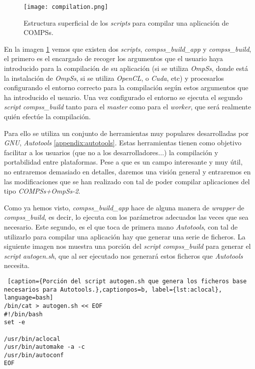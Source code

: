 \bigskip
\begin{figure}[h]
	\centering 
	\caption{Estructura superficial de los \textit{scripts} para compilar una aplicación de COMPSs.}
	\texttt{[image: compilation.png]}
	\label{fig:compilado}
\end{figure}
\par\bigskip

En la imagen \ref{fig:compilado} vemos que existen dos \textit{scripts}, \textit{compss\_build\_app} y \textit{compss\_build}, el primero es el encargado de recoger los argumentos que el usuario haya introducido para la compilación de su aplicación (si se utiliza \textit{OmpSs}, donde está la instalación de \textit{OmpSs}, si se utiliza \textit{OpenCL}, o \textit{Cuda}, etc) y procesarlos configurando el entorno correcto para la compilación según estos argumentos que ha introducido el usuario. Una vez configurado el entorno se ejecuta el segundo \textit{script} \textit{compss\_build} tanto para el \textit{master} como para el \textit{worker}, que será realmente quién efectúe la compilación. 
\par\bigskip
Para ello se utiliza un conjunto de herramientas muy populares desarrolladas por \textit{GNU},  \textit{Autotools} \ref{appendix:autotools}. Estas herramientas tienen como objetivo facilitar a los usuarios (que no a los desarrolladores...) la compilación y portabilidad entre plataformas. Pese a que es un campo interesante y muy útil, no entraremos demasiado en detalles, daremos una visión general y entraremos en las modificaciones que se han realizado con tal de poder compilar aplicaciones del tipo \textit{COMPSs+OmpSs-2}. 
\par\bigskip
Como ya hemos visto, \textit{compss\_build\_app} hace de alguna manera de \textit{wrapper} de \textit{compss\_build}, es decir, lo ejecuta con los parámetros adecuados las veces que sea necesario. Este segundo, es el que toca de primera mano \textit{Autotools}, con tal de utilizarlo para compilar una aplicación hay que generar una serie de ficheros. La siguiente imagen nos muestra una porción del \textit{script}  \textit{compss\_build} para generar el \textit{script} \textit{autogen.sh}, que al ser ejecutado nos generará estos ficheros que \textit{Autotools} necesita.
\bigskip

\begin{minipage}{\linewidth}
\begin{lstlisting} [caption={Porción del script autogen.sh que genera los ficheros base necesarios para Autotools.},captionpos=b, label={lst:aclocal}, language=bash]
/bin/cat > autogen.sh << EOF
#!/bin/bash
set -e

/usr/bin/aclocal
/usr/bin/automake -a -c
/usr/bin/autoconf
EOF       
\end{lstlisting}
\end{minipage}

